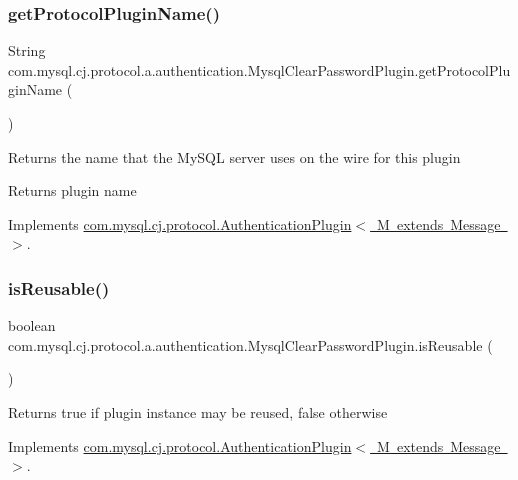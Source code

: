 \subsubsection{\texorpdfstring{get\+Protocol\+Plugin\+Name()}{getProtocolPluginName()}}
{\footnotesize\ttfamily String com.\+mysql.\+cj.\+protocol.\+a.\+authentication.\+Mysql\+Clear\+Password\+Plugin.\+get\+Protocol\+Plugin\+Name (\begin{DoxyParamCaption}{ }\end{DoxyParamCaption})}

Returns the name that the My\+S\+QL server uses on the wire for this plugin

\begin{DoxyReturn}{Returns}
plugin name 
\end{DoxyReturn}


Implements \mbox{\hyperlink{interfacecom_1_1mysql_1_1cj_1_1protocol_1_1_authentication_plugin_ab428486b799598c36f4506c95ff5b94b}{com.\+mysql.\+cj.\+protocol.\+Authentication\+Plugin$<$ M extends Message $>$}}.

\mbox{\label{classcom_1_1mysql_1_1cj_1_1protocol_1_1a_1_1authentication_1_1_mysql_clear_password_plugin_a8ffe3c702b20c1efd428dfef9ba58228}} 
\subsubsection{\texorpdfstring{is\+Reusable()}{isReusable()}}
{\footnotesize\ttfamily boolean com.\+mysql.\+cj.\+protocol.\+a.\+authentication.\+Mysql\+Clear\+Password\+Plugin.\+is\+Reusable (\begin{DoxyParamCaption}{ }\end{DoxyParamCaption})}

\begin{DoxyReturn}{Returns}
true if plugin instance may be reused, false otherwise 
\end{DoxyReturn}


Implements \mbox{\hyperlink{interfacecom_1_1mysql_1_1cj_1_1protocol_1_1_authentication_plugin_afff2eda7e67e6847d2401461100e2c69}{com.\+mysql.\+cj.\+protocol.\+Authentication\+Plugin$<$ M extends Message $>$}}.

